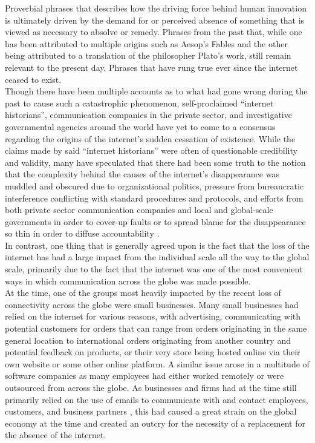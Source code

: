 \documentclass{article}
\theoremstyle{theorem}
\theoremstyle{definition}
\theoremstyle{remark}
\begin{document}
Proverbial phrases that describes how the driving force behind human innovation is ultimately driven by the demand for or perceived absence of something that is viewed as necessary to absolve or remedy. Phrases from the past that, while one has been attributed to multiple origins such as Aesop’s Fables and the other being attributed to a translation of the philosopher Plato’s work, still remain relevant to the present day. Phrases that have rung true ever since the internet ceased to exist. \\

	Though there have been multiple accounts as to what had gone wrong during the past to cause such a catastrophic phenomenon, self-proclaimed “internet historians”, communication companies in the private sector, and investigative governmental agencies around the world have yet to come to a consensus regarding the origins of the internet’s sudden cessation of existence. While the claims made by said “internet historians” were often of questionable credibility and validity, many have speculated that there had been some truth to the notion that the complexity behind the causes of the internet’s disappearance was muddled and obscured due to organizational politics, pressure from bureaucratic interference conflicting with standard procedures and protocols, and efforts from both private sector communication companies and local and global-scale governments in order to cover-up faults \cite{Mmd} or to spread blame for the disappearance so thin in order to diffuse accountability \cite{Ost}.\\

	In contrast, one thing that is generally agreed upon is the fact that the loss of the internet has had a large impact from the individual scale all the way to the global scale, primarily due to the fact that the internet was one of the most convenient ways in which communication across the globe was made possible. \\

	At the time, one of the groups most heavily impacted by the recent loss of connectivity across the globe were small businesses. Many small businesses had relied on the internet for various reasons, with advertising, communicating with potential customers for orders that can range from orders originating in the same general location to international orders originating from another country \cite{Iim} and potential feedback on products, or their very store being hosted online via their own website or some other online platform. A similar issue arose in a multitude of software companies as many employees had either worked remotely or were outsourced from across the globe. As businesses and firms had at the time still primarily relied on the use of emails to communicate with and contact employees, customers, and business partners \cite{Ssb}, this had caused a great strain on the global economy at the time and created an outcry for the necessity of a replacement for the absence of the internet. \\
\end{document}
